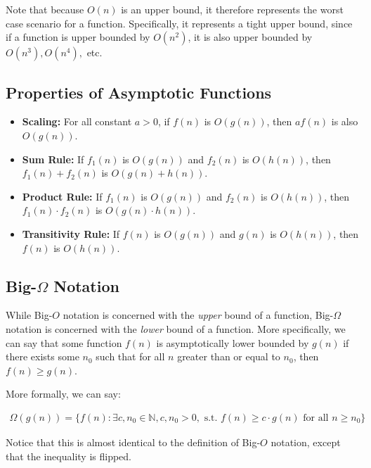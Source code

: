 \documentclass[12pt]{article}
\begin{document}
Note that because $O(n)$ is an upper bound, it therefore represents the worst case scenario for a function. Specifically, it represents a tight upper bound, since if a function is upper bounded by $O(n^2)$, it is also upper bounded by $O(n^3), O(n^4),$ etc.

\subsection{Properties of Asymptotic Functions}

\begin{itemize}
    \item \textbf{Scaling:} For all constant $a>0$, if $f(n)$ is $O(g(n))$, then $af(n)$ is also $O(g(n))$.
    \item \textbf{Sum Rule:} If $f_1(n)$ is $O(g(n))$ and $f_2(n)$ is $O(h(n))$, then $f_1(n) + f_2(n)$ is $O(g(n) + h(n))$.
    \item \textbf{Product Rule:} If $f_1(n)$ is $O(g(n))$ and $f_2(n)$ is $O(h(n))$, then $f_1(n) \cdot f_2(n)$ is $O(g(n) \cdot h(n))$.
    \item \textbf{Transitivity Rule:} If $f(n)$ is $O(g(n))$ and $g(n)$ is $O(h(n))$, then $f(n)$ is $O(h(n))$.
\end{itemize}

\subsection{\texorpdfstring{Big-$\Omega$ Notation}{TEXT}}

While Big-$O$ notation is concerned with the \textit{upper} bound of a function, Big-$\Omega$ notation is concerned with the \textit{lower} bound of a function. More specifically, we can say that some function $f(n)$ is asymptotically lower bounded by $g(n)$ if there exists some $n_0$ such that for all $n$ greater than or equal to $n_0$, then $f(n) \geq g(n)$.

More formally, we can say:

\begin{equation}
    \begin{split}
        \Omega(g(n)) = \{f(n): \exists c, n_0 \in \mathbb{N}, c, n_0 > 0, \text{ s.t. } f(n) \geq c \cdot g(n) \text{ for all } n \geq n_0\}
    \end{split}
\end{equation}

Notice that this is almost identical to the definition of Big-$O$ notation, except that the inequality is flipped.
\end{document}
